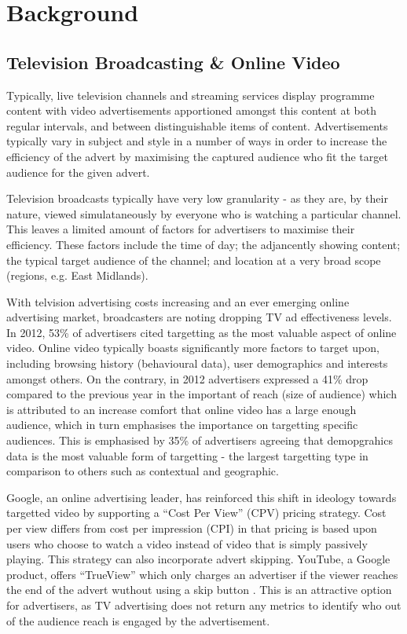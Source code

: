 \section{Background}

	\subsection{Television Broadcasting \& Online Video}

	Typically, live television channels and streaming services display programme content with video advertisements apportioned amongst this content at both regular intervals, and between distinguishable items of content. Advertisements typically vary in subject and style in a number of ways in order to increase the efficiency of the advert by maximising the captured audience who fit the target audience for the given advert.

	Television broadcasts typically have very low granularity - as they are, by their nature, viewed simulataneously by everyone who is watching a particular channel. This leaves a limited amount of factors for advertisers to maximise their efficiency. These factors include the time of day; the adjancently showing content; the typical target audience of the channel; and location at a very broad scope (regions, e.g. East Midlands).

	With telvision advertising costs increasing and an ever emerging online advertising market, broadcasters are noting dropping TV ad effectiveness levels. In 2012, 53\% of advertisers cited targetting as the most valuable aspect of online video. Online video typically boasts significantly more factors to target upon, including browsing history (behavioural data), user demographics and interests amongst others. On the contrary, in 2012 advertisers expressed a 41\% drop compared to the previous year in the important of reach (size of audience) which is attributed to an increase comfort that online video has a large enough audience, which in turn emphasises the importance on targetting specific audiences. This is emphasised by 35\% of advertisers agreeing that demopgrahics data is the most valuable form of targetting - the largest targetting type in comparison to others such as contextual and geographic. \cite{brightroll-report}


	Google, an online advertising leader, has reinforced this shift in ideology towards targetted video by supporting a ``Cost Per View'' (CPV) pricing strategy. Cost per view differs from cost per impression (CPI) in that pricing is based upon users who choose to watch a video instead of video that is simply passively playing. This strategy can also incorporate advert skipping. YouTube, a Google product, offers ``TrueView'' which only charges an advertiser if the viewer reaches the end of the advert wuthout using a skip button \cite{trueview}. This is an attractive option for advertisers, as TV advertising does not return any metrics to identify who out of the audience reach is engaged by the advertisement.

